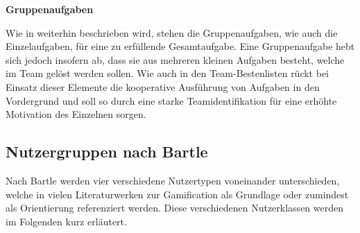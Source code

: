 \documentclass[bibliography=totoc,listof=totoc,BCOR=5mm,DIV=12,oneside]{scrbook}
\begin{document}
\par \bigskip \textbf{Gruppenaufgaben}
\par Wie in \citep[Kapitel 6.1.1 Tasks]{pflanzl2018gamification} weiterhin beschrieben wird, stehen die Gruppenaufgaben, wie auch die Einzelaufgaben, für eine zu erfüllende Gesamtaufgabe. Eine Gruppenaufgabe hebt sich jedoch insofern ab, dass sie aus mehreren kleinen Aufgaben besteht, welche im Team gelöst werden sollen. Wie auch in den Team-Bestenlisten rückt bei Einsatz dieser Elemente die kooperative Ausführung von Aufgaben in den Vordergrund und soll so durch eine starke Teamidentifikation für eine erhöhte Motivation des Einzelnen sorgen.

\subsection{Nutzergruppen nach Bartle} \label{sub:nutzergruppenBartle}
\par Nach Bartle \citep{bartle1996hearts} werden vier verschiedene Nutzertypen voneinander unterschieden, welche in vielen Literaturwerken zur Gamification als Grundlage oder zumindest als Orientierung referenziert werden. Diese verschiedenen Nutzerklassen werden im Folgenden kurz erläutert.
\end{document}
